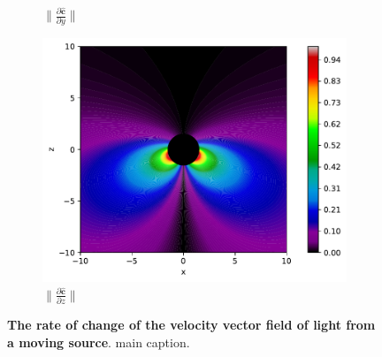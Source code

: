 \begin{figure}[H]
\begin{subfigure}{0.32\textwidth}
		\caption{$\|\frac{\partial \mathbf{\hat{c}}}{\partial y}\|$}
		\label{fig: Rate of change of lights velocity field subfig_2}
	\end{subfigure}
	\begin{subfigure}{0.32\textwidth}
		\centering
		\includegraphics[width=\textwidth]{images/pdf/Rate_of_change_of_lights_velocity_field_with_respect_to_z.pdf}
		\caption{$\|\frac{\partial \mathbf{\hat{c}}}{\partial z}\|$}
		\label{fig: Rate of change of lights velocity field subfig_3}
	\end{subfigure}
	\caption{\textbf{The rate of change of the velocity vector field of light from a moving source}. main caption.}
	\label{fig: Rate of change of lights velocity field}
\end{figure}

